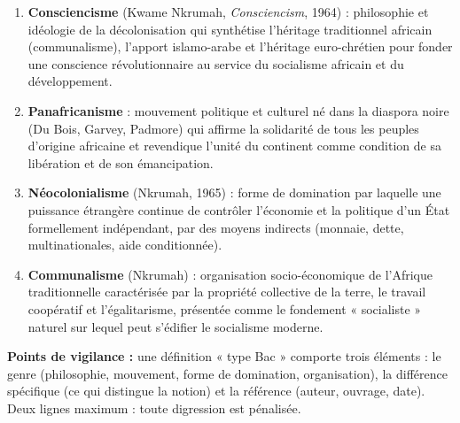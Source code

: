 \documentclass[11pt]{article}
\begin{document}
\begin{corrige}
\begin{enumerate}
\item \textbf{Consciencisme} (Kwame Nkrumah, \emph{Consciencism}, 1964) : philosophie et idéologie de la décolonisation qui synthétise l'héritage traditionnel africain (communalisme), l'apport islamo-arabe et l'héritage euro-chrétien pour fonder une conscience révolutionnaire au service du socialisme africain et du développement.
\item \textbf{Panafricanisme} : mouvement politique et culturel né dans la diaspora noire (Du Bois, Garvey, Padmore) qui affirme la solidarité de tous les peuples d'origine africaine et revendique l'unité du continent comme condition de sa libération et de son émancipation.
\item \textbf{Néocolonialisme} (Nkrumah, 1965) : forme de domination par laquelle une puissance étrangère continue de contrôler l'économie et la politique d'un État formellement indépendant, par des moyens indirects (monnaie, dette, multinationales, aide conditionnée).
\item \textbf{Communalisme} (Nkrumah) : organisation socio-économique de l'Afrique traditionnelle caractérisée par la propriété collective de la terre, le travail coopératif et l'égalitarisme, présentée comme le fondement « socialiste » naturel sur lequel peut s'édifier le socialisme moderne.
\end{enumerate}

\textbf{Points de vigilance :} une définition « type Bac » comporte trois éléments : le genre (philosophie, mouvement, forme de domination, organisation), la différence spécifique (ce qui distingue la notion) et la référence (auteur, ouvrage, date). Deux lignes maximum : toute digression est pénalisée.
\end{corrige}
\end{document}
